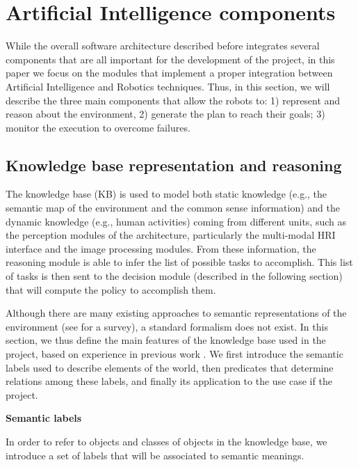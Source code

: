 \section{Artificial Intelligence components}

While the overall software architecture described before integrates several components that are all important for the development of the project, in this paper we focus on the modules that implement a proper integration between Artificial Intelligence and Robotics techniques.
Thus, in this section, we will describe the three main components that allow the robots to: 1) represent and reason about the environment, 2) generate the plan to reach their goals; 3) monitor the execution to overcome failures.



\subsection{Knowledge base representation and reasoning}


The knowledge base (KB) is used to model both static knowledge (e.g., the semantic map of the environment and the common sense information) and the dynamic knowledge (e.g., human activities) coming from different units, such as the perception modules of the architecture, particularly the multi-modal HRI interface and the image processing modules. 
From these information, the reasoning module is able to infer the list of possible tasks to accomplish. This list of tasks is then sent to the decision module (described in the following section) that will compute the policy to accomplish them. 

Although there are many existing approaches to semantic representations of the environment (see \cite{KoGa14} for a survey), a standard formalism does not exist.
In this section, we thus define the main features of the knowledge base used in the project,
based on experience in previous work \cite{icar13bastianelli}. We first introduce the semantic labels used to describe elements of the world, then predicates that determine relations among these labels, and finally its application to the use case if the project.

\vspace{1em}

\noindent 
\textbf{Semantic labels}

In order to refer to objects and classes of objects in the knowledge base, we introduce a set of labels that will be associated to semantic meanings. 

